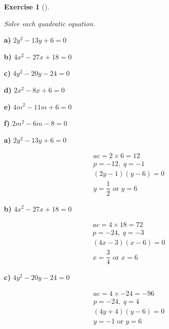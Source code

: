 \documentclass[
  letterpaper,
  DIV=11,
  numbers=noendperiod]{scrreprt}
\theoremstyle{definition}
\newtheorem{exercise}{Exercise}[chapter]
\theoremstyle{remark}
\begin{document}
\begin{exercise}[]\protect\hypertarget{exr-u6-9}{}\label{exr-u6-9}

\emph{Solve each quadratic equation.}

\textbf{a)} \(\displaystyle 2y^2 - 13y + 6 = 0\)

\textbf{b)} \(\displaystyle 4x^2 - 27x + 18 = 0\)

\textbf{c)} \(\displaystyle 4y^2 - 20y - 24 = 0\)

\textbf{d)} \(\displaystyle 2x^2 - 8x + 6 = 0\)

\textbf{e)} \(\displaystyle 4m^2 - 11m + 6 = 0\)

\textbf{f)} \(\displaystyle 2m^2 - 6m - 8 = 0\)

\begin{tcolorbox}[enhanced jigsaw, opacitybacktitle=0.6, coltitle=black, arc=.35mm, colframe=quarto-callout-tip-color-frame, colback=white, bottomrule=.15mm, left=2mm, colbacktitle=quarto-callout-tip-color!10!white, titlerule=0mm, opacityback=0, title=\textcolor{quarto-callout-tip-color}{\faLightbulb}\hspace{0.5em}{🔍 View Solutions}, leftrule=.75mm, breakable, rightrule=.15mm, bottomtitle=1mm, toptitle=1mm, toprule=.15mm]

\textbf{a)} \(\displaystyle 2y^2 - 13y + 6 = 0\)

\begin{align*}
ac = 2 \times 6 = 12 \\ p = -12,\; q = -1 \\ (2y - 1)(y - 6) = 0 \\ y = \dfrac{1}{2} \text{ or } y = 6
\end{align*}

\textbf{b)} \(\displaystyle 4x^2 - 27x + 18 = 0\)

\begin{align*}
ac = 4 \times 18 = 72 \\ p = -24,\; q = -3 \\ (4x - 3)(x - 6) = 0 \\ x = \dfrac{3}{4} \text{ or } x = 6
\end{align*}

\textbf{c)} \(\displaystyle 4y^2 - 20y - 24 = 0\)

\begin{align*}
ac = 4 \times -24 = -96 \\ p = -24,\; q = 4 \\ (4y + 4)(y - 6) = 0 \\ y = -1 \text{ or } y = 6
\end{align*}


\end{tcolorbox}
\end{exercise}
\end{document}
